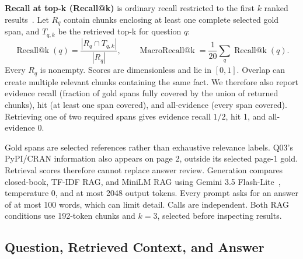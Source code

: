 \documentclass[12pt,a4paper]{article}
\begin{document}
\textbf{Recall at top-k (Recall@k)} is ordinary recall restricted to the first $k$ ranked results~\cite{torchmetrics}. Let $R_q$ contain chunks enclosing at least one complete selected gold span, and $T_{q,k}$ be the retrieved top-k for question $q$:
\[\operatorname{Recall@k}(q)=\frac{|R_q\cap T_{q,k}|}{|R_q|},\qquad
\operatorname{MacroRecall@k}=\frac1{20}\sum_q\operatorname{Recall@k}(q).\]
Every $R_q$ is nonempty. Scores are dimensionless and lie in $[0,1]$. Overlap can create multiple relevant chunks containing the same fact. We therefore also report evidence recall (fraction of gold spans fully covered by the union of returned chunks), hit (at least one span covered), and all-evidence (every span covered). Retrieving one of two required spans gives evidence recall $1/2$, hit 1, and all-evidence 0.

Gold spans are selected references rather than exhaustive relevance labels. Q03's PyPI/CRAN information also appears on page 2, outside its selected page-1 gold. Retrieval scores therefore cannot replace answer review. Generation compares closed-book, TF-IDF RAG, and MiniLM RAG using Gemini 3.5 Flash-Lite~\cite{gemini}, temperature 0, and at most 2048 output tokens. Every prompt asks for an answer of at most 100 words, which can limit detail. Calls are independent. Both RAG conditions use 192-token chunks and $k=3$, selected before inspecting results.

\subsection*{Question, Retrieved Context, and Answer}
\begingroup\small
\setlength{\fboxsep}{7pt}
\noindent{}
\endgroup
\end{document}
